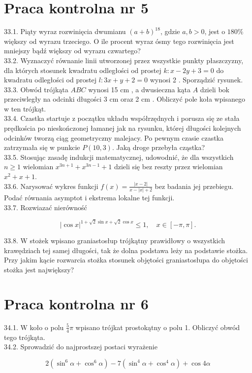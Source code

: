 \documentclass[10pt]{article}
\begin{document}
\section*{Praca kontrolna nr 5}
33.1. Piąty wyraz rozwinięcia dwumianu $(a+b)^{18}$, gdzie $a, b>0$, jest o $180 \%$ większy od wyrazu trzeciego. O ile procent wyraz ósmy tego rozwinięcia jest mniejszy bądź większy od wyrazu czwartego?\\
33.2. Wyznaczyć równanie linii utworzonej przez wszystkie punkty płaszczyzny, dla których stosunek kwadratu odległości od prostej $k: x-2 y+3=0$ do kwadratu odległości od prostej $l: 3 x+y+2=0$ wynosi 2 . Sporządzić rysunek.\\
33.3. Obwód trójkąta $A B C$ wynosi 15 cm , a dwusieczna kąta $A$ dzieli bok przeciwległy na odcinki długości 3 cm oraz 2 cm . Obliczyć pole koła wpisanego w ten trójkąt.\\
33.4. Czastka startuje z początku układu współrzędnych i porusza się ze stała prędkościa po nieskończonej łamanej jak na rysunku, której długości kolejnych odcinków tworzą ciąg geometryczny malejacy. Po pewnym czasie czastka zatrzymała się w punkcie $P(10,3)$. Jaką droge przebyła cząstka?\\
33.5. Stosując zasadę indukcji matematycznej, udowodnić, że dla wszystkich $n \geq 1$ wielomian $x^{3 n+1}+x^{3 n-1}+1$ dzieli się bez reszty przez wielomian $x^{2}+x+1$.\\
33.6. Narysować wykres funkcji $f(x)=\frac{|x-2|}{x-|x|+2}$ bez badania jej przebiegu. Podać równania asymptot i ekstrema lokalne tej funkcji.\\
33.7. Rozwiazać nierówność

$$
|\cos x|^{1+\sqrt{2} \sin x+\sqrt{2} \cos x} \leq 1, \quad x \in[-\pi, \pi] .
$$

33.8. W stożek wpisano graniastosłup trójkątny prawidłowy o wszystkich krawędziach tej samej długości, tak że dolna podstawa leży na podstawie stożka. Przy jakim kącie rozwarcia stożka stosunek objętości graniastosłupa do objętości stożka jest największy?

\section*{Praca kontrolna nr 6}
34.1. W koło o polu $\frac{5}{4} \pi$ wpisano trójkat prostokątny o polu 1. Obliczyć obwód tego trójkąta.\\
34.2. Sprowadzić do najprostszej postaci wyrażenie

$$
2\left(\sin ^{6} \alpha+\cos ^{6} \alpha\right)-7\left(\sin ^{4} \alpha+\cos ^{4} \alpha\right)+\cos 4 \alpha
$$
\end{document}
